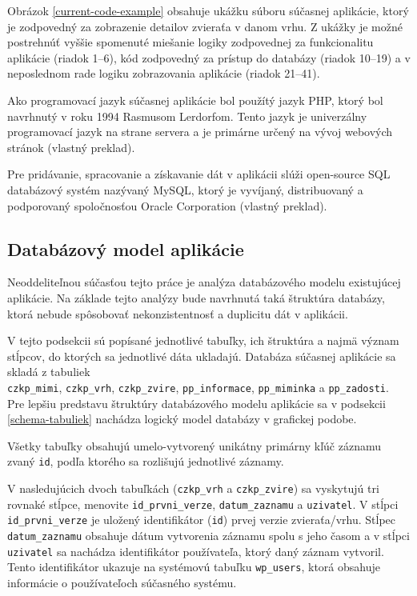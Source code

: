 Obrázok \ref{current-code-example} obsahuje ukážku súboru súčasnej aplikácie, ktorý je zodpovedný za zobrazenie detailov zvieraťa v danom vrhu. Z ukážky je možné postrehnúť vyššie spomenuté miešanie logiky zodpovednej za funkcionalitu aplikácie (riadok 1--6), kód zodpovedný za prístup do databázy (riadok 10--19) a v neposlednom rade logiku zobrazovania aplikácie (riadok 21--41).

Ako programovací jazyk súčasnej aplikácie bol použítý jazyk PHP, ktorý bol navrhnutý v roku 1994 Rasmusom Lerdorfom. Tento jazyk je univerzálny programovací jazyk na strane servera a je primárne určený na vývoj webových stránok \cite{co-je-php} (vlastný preklad).

Pre pridávanie, spracovanie a získavanie dát v aplikácii slúži open-source SQL databázový systém nazývaný MySQL, ktorý je vyvíjaný, distribuovaný a podporovaný spoločnosťou Oracle Corporation \cite{co-je-mysql} (vlastný preklad). 

\subsection{Databázový model aplikácie}\label{sucasny-model-db}
Neoddeliteľnou súčasťou tejto práce je analýza databázového modelu existujúcej aplikácie. Na základe tejto analýzy bude navrhnutá taká štruktúra databázy, ktorá nebude spôsobovať nekonzistentnosť a duplicitu dát v aplikácii.


V tejto podsekcii sú popísané jednotlivé tabuľky, ich štruktúra a najmä význam stĺpcov, do ktorých sa jednotlivé dáta ukladajú.
Databáza súčasnej aplikácie sa skladá z tabuliek\\ \texttt{czkp_mimi}, \texttt{czkp_vrh}, \texttt{czkp_zvire}, \texttt{pp_informace}, \texttt{pp_miminka} a \texttt{pp_zadosti}.
\\Pre lepšiu predstavu štruktúry databázového modelu aplikácie sa v podsekcii \ref{schema-tabuliek} nachádza logický model databázy v grafickej podobe. 


Všetky tabuľky obsahujú umelo-vytvorený unikátny primárny kľúč záznamu zvaný \texttt{id}, podľa ktorého sa rozlišujú jednotlivé záznamy.


V nasledujúcich dvoch tabuľkách (\texttt{czkp_vrh} a \texttt{czkp_zvire}) sa vyskytujú tri rovnaké stĺpce, menovite \texttt{id_prvni_verze},  \texttt{datum_zaznamu} a  \texttt{uzivatel}. V stĺpci \texttt{id_prvni_verze} je uložený identifikátor (\texttt{id}) prvej verzie zvieraťa/vrhu. Stĺpec \texttt{datum_zaznamu} obsahuje dátum vytvorenia záznamu spolu s jeho časom a v stĺpci \texttt{uzivatel} sa nachádza identifikátor používateľa, ktorý daný záznam vytvoril. Tento identifikátor ukazuje na systémovú tabuľku \texttt{wp_users}, ktorá obsahuje informácie o používateľoch súčasného systému.

